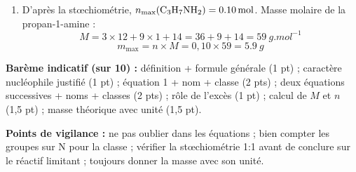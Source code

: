 \documentclass[11pt]{article}
\begin{document}
\begin{corrige}
\begin{enumerate}
\begin{enumerate}
\emph{Remarque :} dans la pratique, on mettrait  en excès (question 5) ; ici l'énoncé impose les quantités égales.
\item D'après la stœchiométrie, $n_{\text{max}}(\ce{C3H7NH2}) = \SI{0,10}{mol}$. Masse molaire de la propan-1-amine  :
\[ M = 3\times 12 + 9\times 1 + 14 = 36 + 9 + 14 = \SI{59}{g.mol^{-1}} \]
\[ m_{\text{max}} = n \times M = 0,10 \times 59 = \boxed{\SI{5,9}{g}} \]
\end{enumerate}
\end{enumerate}
\medskip
\textbf{Barème indicatif (sur 10) :} définition + formule générale (1 pt) ; caractère nucléophile justifié (1 pt) ; équation 1 + nom + classe (2 pts) ; deux équations successives + noms + classes (2 pts) ; rôle de l'excès (1 pt) ; calcul de $M$ et $n$ (1,5 pt) ; masse théorique avec unité (1,5 pt).
\medskip

\textbf{Points de vigilance :} ne pas oublier  dans les équations ; bien compter les groupes sur N pour la classe ; vérifier la stœchiométrie 1:1 avant de conclure sur le réactif limitant ; toujours donner la masse avec son unité.
\end{corrige}
\end{document}
